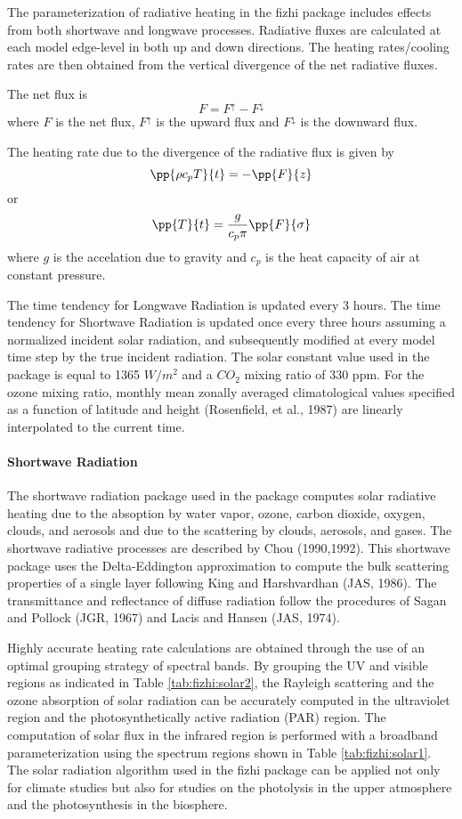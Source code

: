 The parameterization of radiative heating in the fizhi package includes effects 
from both shortwave and longwave processes.
Radiative fluxes are calculated at each
model edge-level in both up and down directions.
The heating rates/cooling rates are then obtained 
from the vertical divergence of the net radiative fluxes.

The net flux is
\[
F = F^\uparrow - F^\downarrow
\]
where $F$ is the net flux, $F^\uparrow$ is the upward flux and $F^\downarrow$ is
the downward flux.

The heating rate due to the divergence of the radiative flux is given by
\[
\pp{\rho c_p T}{t} = - \pp{F}{z}
\]
or
\[
\pp{T}{t} = \frac{g}{c_p \pi} \pp{F}{\sigma}
\]
where $g$ is the accelation due to gravity
and $c_p$ is the heat capacity of air at constant pressure.
  
The time tendency for Longwave
Radiation is updated every 3 hours.  The time tendency for Shortwave Radiation is updated once
every three hours assuming a normalized incident solar radiation, and subsequently modified at
every model time step by the true incident radiation.  
The solar constant value used in the package is equal to 1365 $W/m^2$
and a $CO_2$ mixing ratio of 330 ppm. 
For the ozone mixing ratio, monthly mean zonally averaged 
climatological values specified as a function
of latitude and height (Rosenfield, et al., 1987) are linearly interpolated to the current time.


\paragraph{Shortwave Radiation}

The shortwave radiation package used in the package computes solar radiative 
heating due to the absoption by water vapor, ozone, carbon dioxide, oxygen,
clouds, and aerosols and due to the
scattering by clouds, aerosols, and gases.
The shortwave radiative processes are described by 
Chou (1990,1992). This shortwave package
uses the Delta-Eddington approximation to compute the
bulk scattering properties of a single layer following King and Harshvardhan (JAS, 1986).
The transmittance and reflectance of diffuse radiation
follow the procedures of Sagan and Pollock (JGR, 1967) and Lacis and Hansen (JAS, 1974).

Highly accurate heating rate calculations are obtained through the use
of an optimal grouping strategy of spectral bands.  By grouping the UV and visible regions
as indicated in Table \ref{tab:fizhi:solar2}, the Rayleigh scattering and the ozone absorption of solar radiation
can be accurately computed in the ultraviolet region and the photosynthetically
active radiation (PAR) region.
The computation of solar flux in the infrared region is performed with a broadband
parameterization using the spectrum regions shown in Table \ref{tab:fizhi:solar1}.
The solar radiation algorithm used in the fizhi package can be applied not only for climate studies but
also for studies on the photolysis in the upper atmosphere and the photosynthesis in the biosphere.


